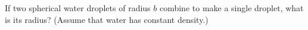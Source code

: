         If two spherical water droplets of radius $b$ combine to make a single droplet,
        what is its radius? (Assume that water has constant density.)

